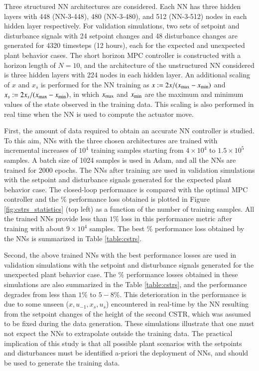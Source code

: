 \documentclass[preprint,5p, twocolumn, authoryear]{elsarticle}
\begin{document}
Three structured NN architectures 
are considered. Each NN
has three hidden layers with 
448 (NN-3-448), 480 (NN-3-480), 
and 512 (NN-3-512)
nodes in each hidden 
layer respectively. For validation simulations, 
two sets of setpoint and disturbance signals 
with 24 setpoint changes and 48 disturbance changes 
are generated for 4320 timesteps (12 hours), 
each for the expected and unexpected 
plant behavior cases. 
The short horizon MPC controller is constructed with a 
horizon length of $N = 10$, and the architecture 
of the unstructured NN considered 
is three hidden layers with 224 nodes in each hidden layer. 
An additional scaling of $x$ and $x_s$ is performed for the 
NN training as $x := 2x/(x_{\textnormal{max}} - x_{\textnormal{min}})$ and 
$x_s := 2x_s/(x_{\textnormal{max}} - x_{\textnormal{min}})$,
in which $x_{\textnormal{max}}$ and $x_{\textnormal{min}}$
are the maximum and minimum values of the state 
observed in the training data.
This scaling is also performed in real time 
when the NN is used to compute the actuator move.

First, the amount of data required to obtain an accurate 
NN controller is studied. To this aim, NNs with 
the three chosen architectures are trained with 
incremental increases of 
$10^4$ training samples starting from $4 \times 10^4$
to $1.5 \times 10^5$ samples. 
A batch size of 1024 samples is used in Adam, 
and all the NNs are trained for 2000 epochs. 
The NNs after training are used in validation simulations
with the setpoint and disturbance
signals generated for the expected plant behavior
case. The closed-loop performance is 
compared with the optimal MPC 
controller and the $\%$ performance loss obtained
is plotted in Figure \ref{fig:cstrs_statistics} (top left)
as a function of the number of training samples.
All the trained NNs provide less than $1 \%$ loss in 
this performance metric after training with 
about $9 \times 10^4$ samples. The best $\%$ performance
loss obtained by the NNs is summarized in
Table \ref{table:cstrs}. 

Second, the above trained NNs with the best 
performance losses are used in validation simulations
with the setpoint and disturbance signals generated 
for the unexpected plant behavior case. The 
$\%$ performance losses obtained in these simulations 
are also summarized in the Table \ref{table:cstrs},
and the performance degrades from 
less than $1\%$ to $5-8\%$. 
This deterioration in the performance is due to some unseen
($x, u_{-1}, x_s, u_s$) encountered in real-time by the NN
resulting from the setpoint changes of the height 
of the second CSTR, which was assumed to be fixed 
during the data generation. 
These simulations illustrate that one must not 
expect the NNs to extrapolate outside the training data.
The practical implication of this study is that 
all possible plant scenarios with the 
setpoints and disturbances 
must be identified a-priori the deployment of NNs, and 
should be used to generate the training data.
\end{document}
